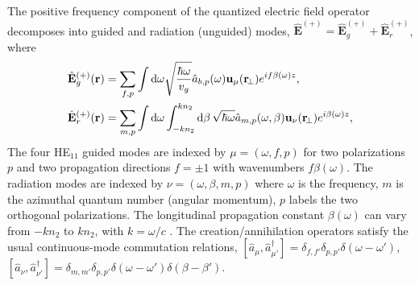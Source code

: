The positive frequency component of the quantized electric field operator decomposes into guided and radiation (unguided) modes, $\hat{\mathbf{E}}^{(+)}=\hat{\mathbf{E}}_g^{(+)}+\hat{\mathbf{E}}_{r}^{(+)}$, where
	\begin{align}
		\hat{\mathbf{E}}_g^{(+)}(\br) &= \sum_{f,p} \int \mathrm{d}\omega  \sqrt{\frac{ \hbar \omega}{ v_g}} \awg \mathbf{u}_\mu (\br\!_\perp) e^{i f\beta(\omega) z } ,\label{Eq::QuantizedElectricField} \\
		\hat{\mathbf{E}}_r^{(+)}(\br) &= \sum_{m,p} \int \mathrm{d}\omega   \int_{-kn_2}^{kn_2}\mathrm{d}\beta \, \sqrt{ \hbar \omega}\awr \mathbf{u}_\nu (\br\!_\perp) e^{i\beta(\omega) z },
	\end{align}
The four HE$_{11}$ guided modes are indexed by $\mu =(\omega, f, p)$ for two polarizations $p$ and two propagation directions $f=\pm1$ with wavenumbers $f\beta (\omega)$.  The radiation modes are indexed by  $\nu=(\omega, \beta, m, p)$ where $\omega$ is the frequency, $m$ is the azimuthal quantum number (angular momentum), $p$ labels the two orthogonal polarizations. The longitudinal propagation constant $\beta(\omega)$ can vary from $-kn_2$ to $kn_2$, with $k = \omega/c$ \cite{Sondergaard2001,LeKien2005a}.  The creation/annihilation operators satisfy the usual continuous-mode commutation relations, $[\hat{a}_\mu, \hat{a}^\dag_{\mu'} ] = \delta_{f,f'} \delta_{p,p'} \delta ( \omega - \omega ') $, $[\hat{a}_\nu ,\hat{a}^\dag_{\nu'} ] = \delta_{m,m'} \delta_{p,p'} \delta ( \omega - \omega ')  \delta ( \beta - \beta') $.

